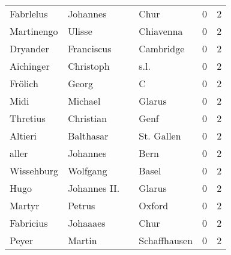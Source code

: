 \documentclass[10pt,a4paper,landscape]{article}
\begin{document}
\begin{longtable}{llllrr}
                Fabrlelus &                           Johannes &             &                                        Chur &          0 &         2 \\
               Martinengo &                             Ulisse &             &                                   Chiavenna &          0 &         2 \\
                 Dryander &                         Franciscus &             &                                   Cambridge &          0 &         2 \\
                Aichinger &                          Christoph &             &                                        s.l. &          0 &         2 \\
                  Frölich &                              Georg &             &                                           C &          0 &         2 \\
                     Midi &                            Michael &             &                                      Glarus &          0 &         2 \\
                 Thretius &                          Christian &             &                                        Genf &          0 &         2 \\
                  Altieri &                          Balthasar &             &                                  St. Gallen &          0 &         2 \\
                    aller &                           Johannes &             &                                        Bern &          0 &         2 \\
               Wissehburg &                           Wolfgang &             &                                       Basel &          0 &         2 \\
                     Hugo &                       Johannes II. &             &                                      Glarus &          0 &         2 \\
                   Martyr &                             Petrus &             &                                      Oxford &          0 &         2 \\
                Fabricius &                           Johaaaes &             &                                        Chur &          0 &         2 \\
                    Peyer &                             Martin &             &                                Schaffhausen &          0 &         2 \\

\end{longtable}
\end{document}
